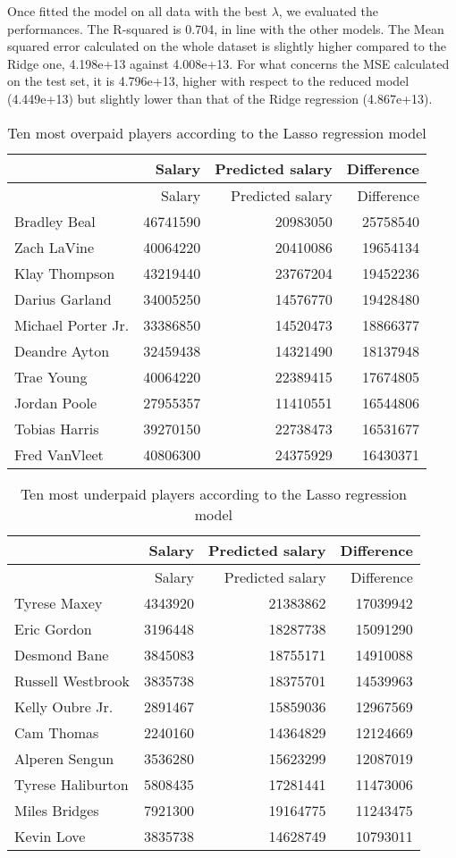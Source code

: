\documentclass[
]{article}
\begin{document}
Once fitted the model on all data with the best \(\lambda\), we
evaluated the performances. The R-squared is 0.704, in line with the
other models. The Mean squared error calculated on the whole dataset is
slightly higher compared to the Ridge one, 4.198e+13 against 4.008e+13.
For what concerns the MSE calculated on the test set, it is 4.796e+13,
higher with respect to the reduced model (4.449e+13) but slightly lower
than that of the Ridge regression (4.867e+13).

\begin{longtable}[]{@{}lrrr@{}}
\caption{Ten most overpaid players according to the Lasso regression
model}\tabularnewline
\toprule()
& Salary & Predicted salary & Difference \\
\midrule()
\endfirsthead
\toprule()
& Salary & Predicted salary & Difference \\
\midrule()
\endhead
Bradley Beal & 46741590 & 20983050 & 25758540 \\
Zach LaVine & 40064220 & 20410086 & 19654134 \\
Klay Thompson & 43219440 & 23767204 & 19452236 \\
Darius Garland & 34005250 & 14576770 & 19428480 \\
Michael Porter Jr. & 33386850 & 14520473 & 18866377 \\
Deandre Ayton & 32459438 & 14321490 & 18137948 \\
Trae Young & 40064220 & 22389415 & 17674805 \\
Jordan Poole & 27955357 & 11410551 & 16544806 \\
Tobias Harris & 39270150 & 22738473 & 16531677 \\
Fred VanVleet & 40806300 & 24375929 & 16430371 \\
\bottomrule()
\end{longtable}

\begin{longtable}[]{@{}lrrr@{}}
\caption{Ten most underpaid players according to the Lasso regression
model}\tabularnewline
\toprule()
& Salary & Predicted salary & Difference \\
\midrule()
\endfirsthead
\toprule()
& Salary & Predicted salary & Difference \\
\midrule()
\endhead
Tyrese Maxey & 4343920 & 21383862 & 17039942 \\
Eric Gordon & 3196448 & 18287738 & 15091290 \\
Desmond Bane & 3845083 & 18755171 & 14910088 \\
Russell Westbrook & 3835738 & 18375701 & 14539963 \\
Kelly Oubre Jr. & 2891467 & 15859036 & 12967569 \\
Cam Thomas & 2240160 & 14364829 & 12124669 \\
Alperen Sengun & 3536280 & 15623299 & 12087019 \\
Tyrese Haliburton & 5808435 & 17281441 & 11473006 \\
Miles Bridges & 7921300 & 19164775 & 11243475 \\
Kevin Love & 3835738 & 14628749 & 10793011 \\
\bottomrule()
\end{longtable}
\end{document}
